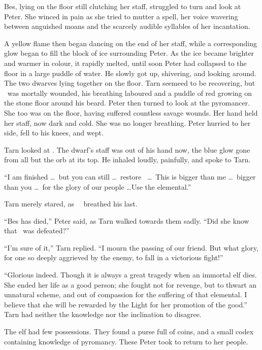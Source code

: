 Bes, lying on the floor still clutching her staff, struggled to turn and look at Peter.  She winced in pain as she tried to mutter a spell, her voice wavering between anguished moans and the scarcely audible syllables of her incantation.

A yellow flame then began dancing on the end of her staff, while a corresponding glow began to fill the block of ice surrounding Peter.  As the ice became brighter and warmer in colour, it rapidly melted, until soon Peter had collapsed to the floor in a large puddle of water.  He slowly got up, shivering, and looking around.  The two dwarves lying together on the floor.  Tarn seemeed to be recovering, but \mothzam\ was mortally wounded, his breathing laboured and a puddle of red growing on the stone floor around his beard.  Peter then turned to look at the pyromancer.  She too was on the floor, having suffered countless savage wounds.  Her hand held her staff, now dark and cold.  She was no longer breathing.  Peter hurried to her side, fell to his knees, and wept.

Tarn looked at \mothzam.  The dwarf's staff was out of his hand now, the blue glow gone from all but the orb at its top.  He inhaled loudly, painfully, and spoke to Tarn.

``I am finished \ldots\ but you can still \ldots\ restore \valdunmir\ \ldots\ This is bigger than me \ldots\ bigger than you \ldots\ for the glory of our people \ldots Use the elemental.''

Tarn merely stared, as \mothzam\ \driktur\ breathed his last.

``Bes has died,'' Peter said, as Tarn walked towards them sadly.  ``Did she know that \mothzam\ was defeated?''

``I'm sure of it,'' Tarn replied.  ``I mourn the passing of our friend.  But what glory, for one so deeply aggrieved by the enemy, to fall in a victorious fight!''

``Glorious indeed.  Though it is always a great tragedy when an immortal elf dies.  She ended her life as a good person; she fought not for revenge, but to thwart an unnatural scheme, and out of compassion for the suffering of that elemental.  I believe that she will be rewarded by the Light for her promotion of the good.''  Tarn had neither the knowledge nor the inclination to disagree.

The elf had few possessions.  They found a purse full of coins, and a small codex containing knowledge of pyromancy.  These Peter took to return to her people.

